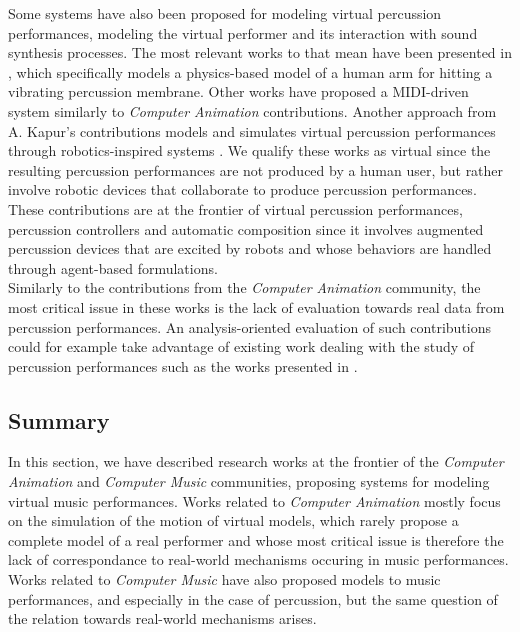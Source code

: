 {{Some systems have also been proposed for modeling virtual percussion performances, modeling the virtual performer and its interaction with sound synthesis processes. The most relevant works to that mean have been presented in , which specifically models a physics-based model of a human arm for hitting a vibrating percussion membrane. Other works have proposed a MIDI-driven system  similarly to \emph{Computer Animation} contributions. Another approach from A. Kapur's contributions models and simulates virtual percussion performances through robotics-inspired systems . We qualify these works as virtual since the resulting percussion performances are not produced by a human user, but rather involve robotic devices that collaborate to produce percussion performances. These contributions are at the frontier of virtual percussion performances, percussion controllers and automatic composition since it involves augmented percussion devices that are excited by robots and whose behaviors are handled through agent-based formulations.\\

Similarly to the contributions from the \emph{Computer Animation} community, the most critical issue in these works is the lack of evaluation towards real data from percussion performances. An analysis-oriented evaluation of such contributions could for example take advantage of existing work dealing with the study of percussion performances such as the works presented in .


		\subsection{Summary}
		\label{subsec:SMP_summary}

In this section, we have described research works at the frontier of the \emph{Computer Animation} and \emph{Computer Music} communities, proposing systems for modeling virtual music performances. Works related to \emph{Computer Animation} mostly focus on the simulation of the motion of virtual models, which rarely propose a complete model of a real performer and whose most critical issue is therefore the lack of correspondance to real-world mechanisms occuring in music performances. Works related to \emph{Computer Music} have also proposed models to music performances, and especially in the case of percussion, but the same question of the relation towards real-world mechanisms arises.\\

}}
